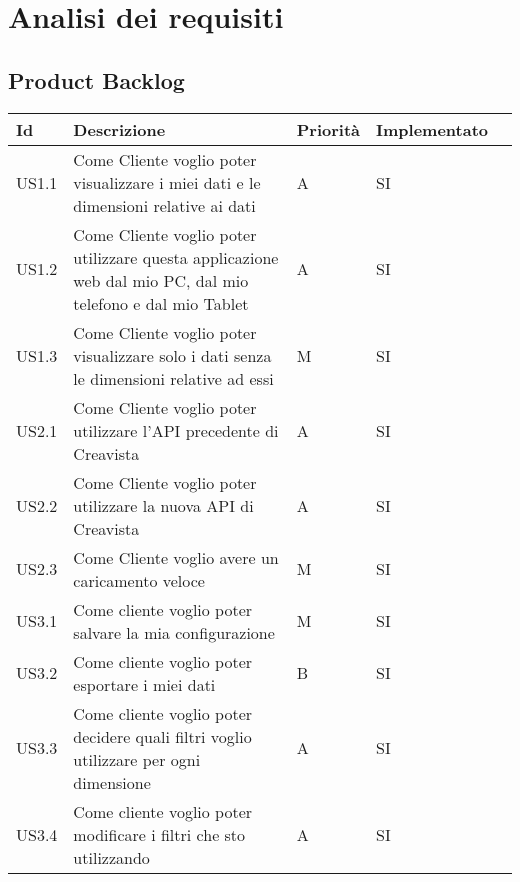 
\chapter{Analisi dei requisiti}
\label{cap:analisi-requisiti}

\section{Product Backlog}
\begin{longtable} {
		|>{}p{10mm}| 
		|>{}p{70mm}|
		|>{}p{15mm}|
		|>{}p{25mm}|
		>{}p{0mm}}
	\hline
	\textbf{Id} & \textbf{Descrizione} & \textbf{Priorità} & \textbf{Implementato} \\ \hline
	US1.1 & Come Cliente voglio poter visualizzare i miei dati e le dimensioni relative ai dati & A & SI \\ \hline
	US1.2 & Come Cliente voglio poter utilizzare questa applicazione web dal mio PC, dal mio telefono e dal mio Tablet & A & SI \\ \hline
	US1.3 & Come Cliente voglio poter visualizzare solo i dati senza le dimensioni relative ad essi & M & SI \\ \hline
	US2.1 & Come Cliente voglio poter utilizzare l'API precedente di Creavista & A & SI \\ \hline
	US2.2 & Come Cliente voglio poter utilizzare la nuova API di Creavista & A & SI \\ \hline
	US2.3 & Come Cliente voglio avere un caricamento veloce & M & SI \\ \hline
	US3.1 & Come cliente voglio poter salvare la mia configurazione & M & SI \\ \hline
	US3.2 & Come cliente voglio poter esportare i miei dati & B & SI \\ \hline
	US3.3 & Come cliente voglio poter decidere quali filtri voglio utilizzare per ogni dimensione & A & SI \\ \hline
	US3.4 & Come cliente voglio poter modificare i filtri che sto utilizzando & A & SI \\ \hline
	\hline
\end{longtable}
\newpage
